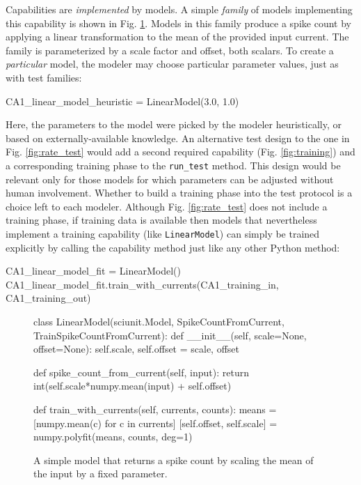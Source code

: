 \documentclass[11pt,letterpaper]{article}
\begin{document}
Capabilities are \emph{implemented} by models. 
A simple \emph{family} of models implementing this capability is shown in Fig. \ref{fig:simple_model}. 
Models in this family produce a spike count by applying a linear transformation to the mean of the provided input current. 
The family is parameterized by a scale factor and offset, both scalars. 
To create a \emph{particular} model, the modeler may choose particular parameter values, just as with test families:
\begin{python}
CA1_linear_model_heuristic = LinearModel(3.0, 1.0)
\end{python}
Here, the parameters to the model were picked by the modeler heuristically, or based on externally-available knowledge. 
An alternative test design to the one in Fig. \ref{fig:rate_test} would add a second required capability (Fig. \ref{fig:training}) and a corresponding training phase to the \verb|run_test| method. 
This design would be relevant only for those models for which parameters can be adjusted without human involvement. 
Whether to build a training phase into the test protocol is a choice left to each modeler. 
Although Fig. \ref{fig:rate_test} does not include a training phase, if training data is available then models that nevertheless implement a training capability (like \verb|LinearModel|) can simply be trained explicitly by calling the capability method just like any other Python method:
\begin{python}
CA1_linear_model_fit = LinearModel()
CA1_linear_model_fit.train_with_currents(CA1_training_in, CA1_training_out)
\end{python}
\begin{figure}
\begin{python}
class LinearModel(sciunit.Model, SpikeCountFromCurrent, 
    TrainSpikeCountFromCurrent):
  def __init__(self, scale=None, offset=None): 
    self.scale, self.offset = scale, offset
    
  def spike_count_from_current(self, input):
    return int(self.scale*numpy.mean(input) + self.offset)

  def train_with_currents(self, currents, counts):
    means = [numpy.mean(c) for c in currents]
    [self.offset, self.scale] = numpy.polyfit(means, counts, deg=1)    
\end{python}
\caption{A simple model that returns a spike count by scaling the mean of the input by a fixed parameter.}
\label{fig:simple_model}
\vspace{-15px}
\end{figure}
\end{document}
